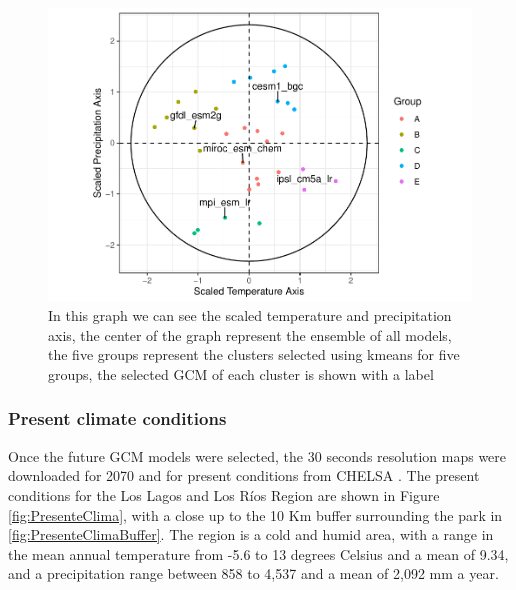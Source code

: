 \documentclass[]{article}
\begin{document}
\begin{figure}
\centering
\includegraphics{Review_and_climate_files/figure-latex/SelectedGCMs-1.pdf}
\caption{\label{fig:SelectedGCMs}In this graph we can see the scaled temperature and precipitation axis, the center of the graph represent the ensemble of all models, the five groups represent the clusters selected using kmeans for five groups, the selected GCM of each cluster is shown with a label}
\end{figure}

\hypertarget{present-climate-conditions}{%
\subsubsection{Present climate conditions}\label{present-climate-conditions}}

Once the future GCM models were selected, the 30 seconds resolution maps were downloaded for 2070 and for present conditions from CHELSA \citep{karger2020high}.
The present conditions for the Los Lagos and Los Ríos Region are shown in Figure \ref{fig:PresenteClima}, with a close up to the 10 Km buffer surrounding the park in \ref{fig:PresenteClimaBuffer}. The region is a cold and humid area, with a range in the mean annual temperature from -5.6 to 13 degrees Celsius and a mean of 9.34, and a precipitation range between 858 to 4,537 and a mean of 2,092 mm a year.
\end{document}
